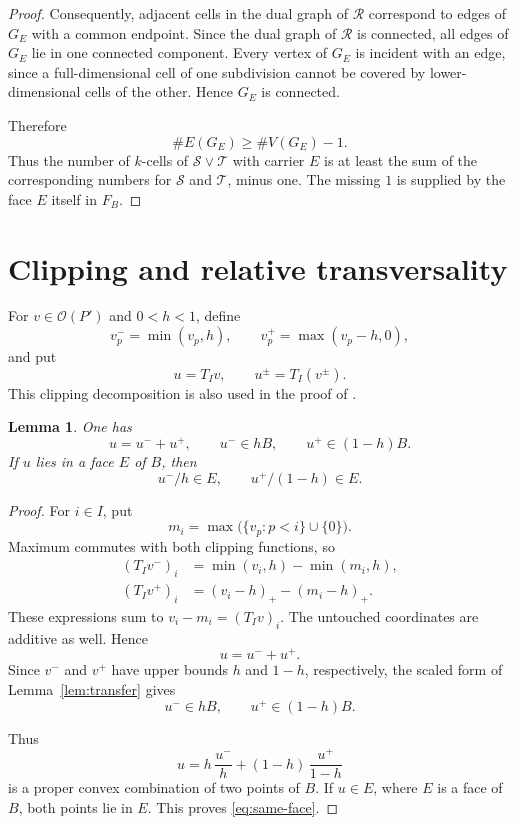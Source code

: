 \documentclass[a4paper,12pt]{amsart}
\newtheorem{lemma}[theorem]{Lemma}
\theoremstyle{definition}
\theoremstyle{remark}
\newcommand{\OO}{\mathcal O}
\begin{document}
\begin{proof}
Consequently, adjacent cells in the dual graph of $\mathcal R$ correspond to edges of $G_E$ with a common endpoint.
Since the dual graph of $\mathcal R$ is connected, all edges of $G_E$ lie in one connected component.
Every vertex of $G_E$ is incident with an edge, since a full-dimensional cell of one subdivision cannot be covered by lower-dimensional cells of the other.
Hence $G_E$ is connected.

Therefore
\[
 \#E(G_E)\geq \#V(G_E)-1.
\]
Thus the number of $k$-cells of $\mathcal S\vee\mathcal T$ with carrier $E$ is at least the sum of the corresponding numbers for $\mathcal S$ and $\mathcal T$, minus one.
The missing $1$ is supplied by the face $E$ itself in $F_B$.
\end{proof}

\section{Clipping and relative transversality}\label{sec5}

For $v\in\OO(P')$ and $0<h<1$, define
\[
 v^-_p=\min(v_p,h),  \qquad  v^+_p=\max(v_p-h,0),
\]
and put
\[
 u=T_Iv,  \qquad  u^\pm=T_I(v^\pm).
\]
This clipping decomposition is also used in the proof of \cite[Proposition~15]{FFP20}.

\begin{lemma}\label{lem:clipping}
One has
\begin{equation}\label{eq:clipping}
 u=u^-+u^+,  \qquad  u^-\in hB,  \qquad  u^+\in(1-h)B.
\end{equation}
If $u$ lies in a face $E$ of $B$, then
\begin{equation}\label{eq:same-face}
 u^-/h\in E,  \qquad  u^+/(1-h)\in E.
 \end{equation}
\end{lemma}

\begin{proof}
For $i\in I$, put
\[
 m_i=\max\bigl(\{v_p:p<i\}\cup\{0\}\bigr).
\]
Maximum commutes with both clipping functions, so
\begin{align*}
 (T_Iv^-)_i  &=  \min(v_i,h)-\min(m_i,h),\\
 (T_Iv^+)_i  &=  (v_i-h)_+-(m_i-h)_+.
\end{align*}
These expressions sum to $v_i-m_i=(T_Iv)_i$.
The untouched coordinates are additive as well.
Hence
\[
 u=u^-+u^+.
\]
Since $v^-$ and $v^+$ have upper bounds $h$ and $1-h$, respectively, the scaled form of Lemma~\ref{lem:transfer} gives
\[
 u^-\in hB,  \qquad  u^+\in(1-h)B.
\]

Thus
\[
 u  = h\,\frac{u^-}{h} +(1-h)\,\frac{u^+}{1-h}
 \]
is a proper convex combination of two points of $B$.
If $u\in E$, where $E$ is a face of $B$, both points lie in $E$.
This proves \eqref{eq:same-face}.
\end{proof}
\end{document}
